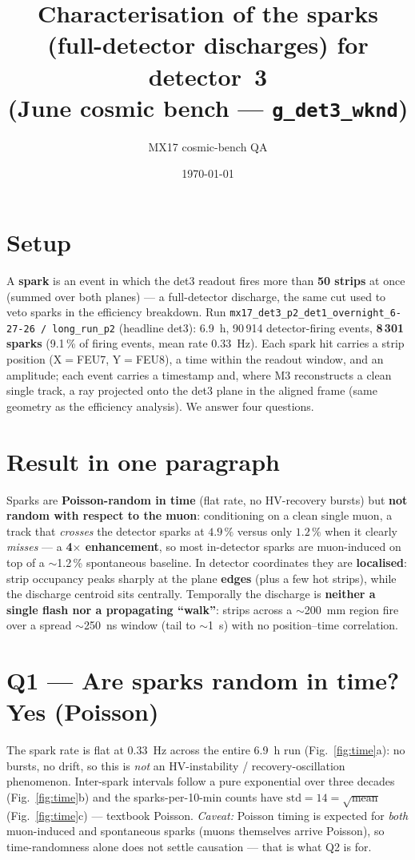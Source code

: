 \documentclass[11pt]{article}
\title{\vspace{-2.5em}Characterisation of the sparks (full-detector discharges)
for detector~3\\\large (June cosmic bench --- \texttt{g\_det3\_wknd})}
\author{MX17 cosmic-bench QA}
\date{\today}
\begin{document}
\maketitle
\vspace{-1.5em}

\section{Setup}
A \textbf{spark} is an event in which the det3 readout fires more than
\textbf{50 strips} at once (summed over both planes) --- a full-detector discharge,
the same cut used to veto sparks in the efficiency breakdown. Run
\texttt{mx17\_det3\_p2\_det1\_overnight\_6-27-26 / long\_run\_p2} (headline det3):
6.9~h, 90\,914 detector-firing events, \textbf{8\,301 sparks} (9.1\,\% of firing
events, mean rate 0.33~Hz). Each spark hit carries a strip position (X$=$FEU7,
Y$=$FEU8), a time within the readout window, and an amplitude; each event carries a
timestamp and, where M3 reconstructs a clean single track, a ray projected onto the
det3 plane in the aligned frame (same geometry as the efficiency analysis). We answer
four questions.

\section{Result in one paragraph}
Sparks are \textbf{Poisson-random in time} (flat rate, no HV-recovery bursts) but
\textbf{not random with respect to the muon}: conditioning on a clean single muon, a
track that \emph{crosses} the detector sparks at $4.9\,\%$ versus only $1.2\,\%$ when it
clearly \emph{misses} --- a \textbf{4$\times$ enhancement}, so most in-detector sparks
are muon-induced on top of a $\sim$1.2\,\% spontaneous baseline. In detector coordinates
they are \textbf{localised}: strip occupancy peaks sharply at the plane \textbf{edges}
(plus a few hot strips), while the discharge centroid sits centrally. Temporally the
discharge is \textbf{neither a single flash nor a propagating ``walk''}: strips across a
$\sim$200~mm region fire over a spread $\sim$250~ns window (tail to $\sim$1~\textmu s)
with no position--time correlation.

\section{Q1 --- Are sparks random in time?  Yes (Poisson)}
The spark rate is flat at $0.33$~Hz across the entire 6.9~h run
(Fig.~\ref{fig:time}a): no bursts, no drift, so this is \emph{not} an HV-instability /
recovery-oscillation phenomenon. Inter-spark intervals follow a pure exponential over
three decades (Fig.~\ref{fig:time}b) and the sparks-per-10-min counts have
$\mathrm{std}=14=\sqrt{\mathrm{mean}}$ (Fig.~\ref{fig:time}c) --- textbook Poisson.
\emph{Caveat:} Poisson timing is expected for \emph{both} muon-induced and spontaneous
sparks (muons themselves arrive Poisson), so time-randomness alone does not settle
causation --- that is what Q2 is for.
\end{document}

